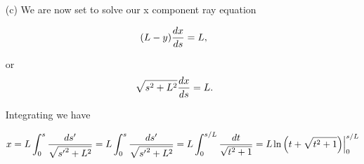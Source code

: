 {\begin{enumerate}
Let's look at the small limit where $s \ll L$

\begin{dmath}\label{eqn:modernOpticsProblemSet1P2:250}
y(s)
\sim L \left( 1 - \left( 1 + \inv{2} \left(\frac{s}{L}\right)^2 \right) \right),
\end{dmath}

\begin{equation}\label{eqn:modernOpticsProblemSet1P2:1890}
\boxed{
y(s) \sim -\frac{s^2}{2 L} \quad \mbox{when $ s \ll L$}.
}
\end{equation}

In the large limit for $s \gg L$ the $s^2$ term dominates, leaving

\begin{dmath}\label{eqn:modernOpticsProblemSet1P2:270}
\boxed{
y(s) \sim - s \quad \mbox{when $s \gg L$}.
}
\end{dmath}

A plot of $y/L$, $-s/L$, and $-s^2/2 L^2$ can be found in \cref{fig:modernOpticsProblemSet1:modernOpticsProblemSet1Fig2b} and \cref{fig:modernOpticsProblemSet1:modernOpticsProblemSet1Fig2bBig}.


\item[(c)]
We are now set to solve our x component ray equation

\begin{dmath}\label{eqn:modernOpticsProblemSet1P2:290}
(L - y) \dds{x} = L,
\end{dmath}

or
\begin{dmath}\label{eqn:modernOpticsProblemSet1P2:310}
\sqrt{s^2 + L^2} \dds{x} = L.
\end{dmath}

Integrating we have

\begin{dmath}\label{eqn:modernOpticsProblemSet1P2:330}
x
= L \int_0^s \frac{ds'}{\sqrt{{s'}^2 + L^2}}
= L \int_0^s \frac{ds'}{\sqrt{{s'}^2 + L^2}}
= L \int_0^{s/L} \frac{dt}{\sqrt{t^2 + 1}}
= L \evalrange{ \ln\left( t + \sqrt{ t^2 + 1} \right) }{0}{s/L}
\end{dmath}


\end{enumerate}}
